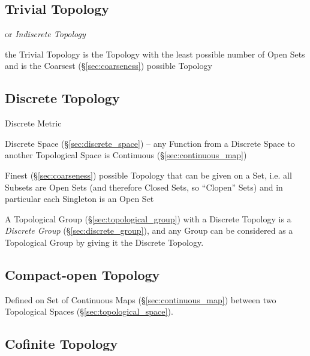 \subsection{Trivial Topology}\label{sec:trivial_topology}

or \emph{Indiscrete Topology}

the Trivial Topology is the Topology with the least possible number of Open
Sets and is the Coarsest (\S\ref{sec:coarseness}) possible Topology



\subsection{Discrete Topology}\label{sec:discrete_topology}

Discrete Metric

Discrete Space (\S\ref{sec:discrete_space}) -- any Function from a Discrete
Space to another Topological Space is Continuous (\S\ref{sec:continuous_map})

Finest (\S\ref{sec:coarseness}) possible Topology that can be given on a Set,
i.e. all Subsets are Open Sets (and therefore Closed Sets, so ``Clopen'' Sets)
and in particular each Singleton is an Open Set

A Topological Group (\S\ref{sec:topological_group}) with a Discrete Topology is
a \emph{Discrete Group} (\S\ref{sec:discrete_group}), and any Group can be
considered as a Topological Group by giving it the Discrete Topology.



\subsection{Compact-open Topology}\label{sec:compact_open}

Defined on Set of Continuous Maps (\S\ref{sec:continuous_map}) between
two Topological Spaces (\S\ref{sec:topological_space}).



\subsection{Cofinite Topology}\label{sec:cofinite_topology}

